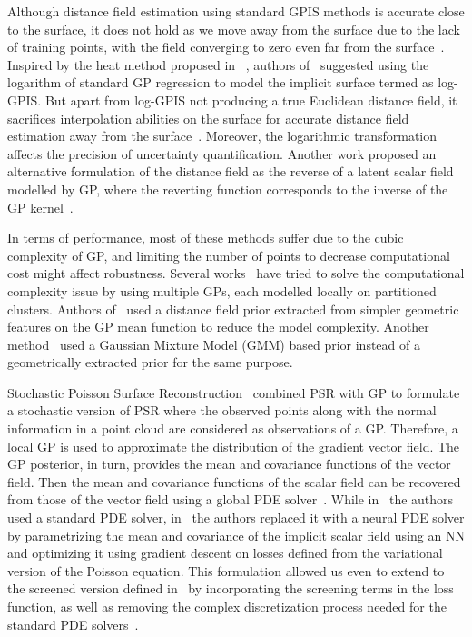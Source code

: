 Although distance field estimation using standard GPIS methods is accurate close to the surface, it does not hold as we move away from the surface due to the lack of training points, with the field converging to zero even far from the surface~\cite{logGPIS}. Inspired by the heat method proposed in ~\cite{GeodesicHeat}, authors of~\cite{logGPIS} suggested using the logarithm of standard GP regression to model the implicit surface termed as log-GPIS. But apart from log-GPIS not producing a true Euclidean distance field, it sacrifices interpolation abilities on the surface for accurate distance field estimation away from the surface~\cite{onlinePriorGPIS}. Moreover, the logarithmic transformation affects the precision of uncertainty quantification. Another work proposed an alternative formulation of the distance field as the reverse of a latent scalar field modelled by GP, where the reverting function corresponds to the inverse of the GP kernel~\cite{GPDF}.
\newline

In terms of performance, most of these methods suffer due to the cubic complexity of GP, and limiting the number of points to decrease computational cost might affect robustness. Several works~\cite{mixGPOccMap, locGPOccMap, onlineGPIS} have tried to solve the computational complexity issue by using multiple GPs, each modelled locally on partitioned clusters. Authors of~\cite{onlinePriorGPIS} used a distance field prior extracted from simpler geometric features on the GP mean function to reduce the model complexity. Another method~\cite{GMMGP} used a Gaussian Mixture Model (GMM) based prior instead of a geometrically extracted prior for the same purpose.
\newline

Stochastic Poisson Surface Reconstruction~\cite{SPSR} combined PSR with GP to formulate a stochastic version of PSR where the observed points along with the normal information in a point cloud are considered as observations of a GP. Therefore, a local GP is used to approximate the distribution of the gradient vector field. The GP posterior, in turn, provides the mean and covariance functions of the vector field. Then the mean and covariance functions of the scalar field can be recovered from those of the vector field using a global PDE solver~\cite{SPSR}. While in~\cite{SPSR} the authors used a standard PDE solver, in~\cite{NeuralSPSR} the authors replaced it with a neural PDE solver by parametrizing the mean and covariance of the implicit scalar field using an NN and optimizing it using gradient descent on losses defined from the variational version of the Poisson equation. This formulation allowed us even to extend to the screened version defined in~\cite{ScreenedPSR} by incorporating the screening terms in the loss function, as well as removing the complex discretization process needed for the standard PDE solvers~\cite{NeuralSPSR}. 

